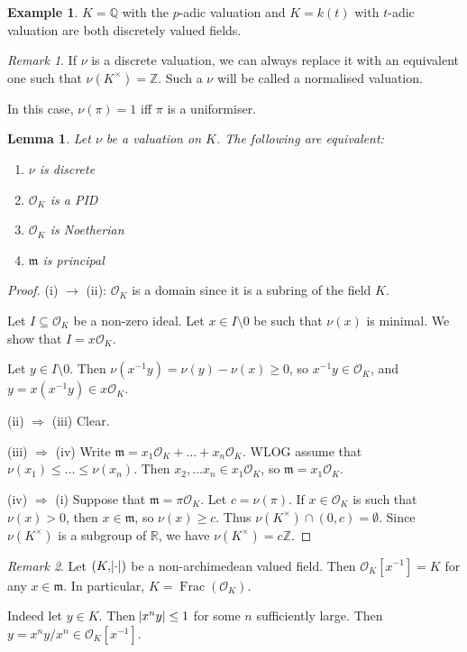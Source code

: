 \documentclass[12pt]{amsart}
\theoremstyle{definition}
\newtheorem*{example}{Example}
\theoremstyle{plain}
\newtheorem{lemma}[definition]{Lemma}
\theoremstyle{remark}
\newtheorem*{remark}{Remark}
\DeclareMathOperator{\Frac}{\mathrm{Frac}}
\newcommand{\bZ}{\mathbb{Z}}
\newcommand{\bQ}{\mathbb{Q}}
\newcommand{\bR}{\mathbb{R}}
\newcommand{\cO}{\mathcal{O}}
\newcommand{\fm}{\mathfrak{m}}
\begin{document}
\begin{example}
    $K = \bQ$ with the $p$-adic valuation and $K = k(t)$ with $t$-adic valuation are both discretely valued fields.
\end{example}

\begin{remark}
    If $\nu$ is a discrete valuation, we can always replace it with an equivalent one such that $\nu(K^\times) = \bZ$. Such a $\nu$ will be called a normalised valuation.

    In this case, $\nu(\pi) = 1$ iff $\pi$ is a uniformiser.
\end{remark}

\begin{lemma}\label{lem:2_6}
    Let $\nu$ be a valuation on $K$. The following are equivalent:
    \begin{enumerate}
        \item $\nu$ is discrete
        \item $\cO_K$ is a PID
        \item $\cO_K$ is Noetherian
        \item $\fm$ is principal
    \end{enumerate}
\end{lemma}
\begin{proof}
    (i) $\rightarrow$ (ii): $\cO_K$ is a domain since it is a subring of the field $K$.

    Let $I \subseteq \cO_K$ be a non-zero ideal. Let $x \in I \setminus 0$ be such that $\nu(x)$ is minimal. We show that $I = x \cO_K$.

    Let $y \in I \setminus 0$. Then $\nu(x^{-1} y) = \nu(y) - \nu(x) \ge 0$, so $x^{-1} y \in \cO_K$, and $y = x(x^{-1} y) \in x \cO_K$.

    (ii) $\Rightarrow$ (iii) Clear.

    (iii) $\Rightarrow$ (iv) Write $\fm = x_1 \cO_K + \ldots + x_n \cO_K$. WLOG assume that $\nu(x_1) \le \ldots \le \nu(x_n)$. Then $x_2, \ldots x_n \in x_1 \cO_K$, so $\fm = x_1 \cO_K$.

    (iv) $\Rightarrow$ (i) Suppose that $\fm = \pi \cO_K$. Let $c = \nu(\pi)$. If $x \in \cO_K$ is such that $\nu(x) > 0$, then $x \in \fm$, so $\nu(x) \ge c$. Thus $\nu(K^\times) \cap (0, c) = \emptyset$. Since $\nu(K^\times)$ is a subgroup of $\bR$, we have $\nu(K^\times) = c \bZ$.
\end{proof}

\begin{remark}
    Let $(K, \abs{\cdot})$ be a non-archimedean valued field. Then $\cO_K[x^{-1}] = K$ for any $x \in \fm$. In particular, $K = \Frac(\cO_K)$.

    Indeed let $y \in K$. Then $\abs{x^n y} \le 1$ for some $n$ sufficiently large. Then $y = x^n y / x^n \in \cO_K[x^{-1}]$.
\end{remark}
\end{document}
